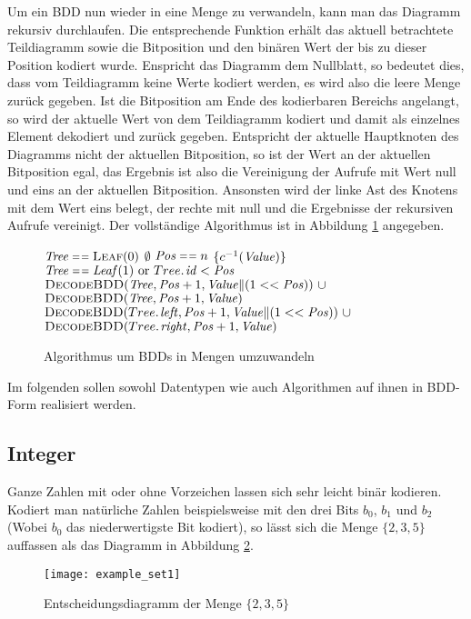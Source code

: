Um ein BDD nun wieder in eine Menge zu verwandeln, kann man das Diagramm rekursiv durchlaufen.
Die entsprechende Funktion erhält das aktuell betrachtete Teildiagramm sowie die Bitposition und den binären Wert der bis zu dieser Position kodiert wurde.
Enspricht das Diagramm dem Nullblatt, so bedeutet dies, dass vom Teildiagramm keine Werte kodiert werden, es wird also die leere Menge zurück gegeben.
Ist die Bitposition am Ende des kodierbaren Bereichs angelangt, so wird der aktuelle Wert von dem Teildiagramm kodiert und damit als einzelnes Element dekodiert und zurück gegeben.
Entspricht der aktuelle Hauptknoten des Diagramms nicht der aktuellen Bitposition, so ist der Wert an der aktuellen Bitposition egal, das Ergebnis ist also die Vereinigung der Aufrufe mit Wert null und eins an der aktuellen Bitposition.
Ansonsten wird der linke Ast des Knotens mit dem Wert eins belegt, der rechte mit null und die Ergebnisse der rekursiven Aufrufe vereinigt.
Der vollständige Algorithmus ist in Abbildung \ref{alg:decode_bdd} angegeben.

\begin{figure}[h]
\begin{codebox}
\li \If $\id{Tree}\isequal\proc{Leaf}(0)$\Then
\li \Return $\emptyset$
\li \ElseIf $\id{Pos}\isequal n$\Then
\li \Return $\{c^{-1}(\id{Value})\}$
\li \ElseIf $\id{Tree}\isequal\id{Leaf}(1)\mbox{ or }\attrib{Tree}{id}<\id{Pos}$\Then
\li \Return $\proc{DecodeBDD}(\id{Tree},\id{Pos}+1,\id{Value}\|(1<<\id{Pos}))\ \cup$
\Startalign{\Return}
\> $\proc{DecodeBDD}(\id{Tree},\id{Pos}+1,\id{Value})$
\Stopalign
\li \Else
\li \Return $\proc{DecodeBDD}(\attrib{Tree}{left},\id{Pos}+1,\id{Value}\|(1<<\id{Pos}))\ \cup$
\Startalign{\Return}
\> $\proc{DecodeBDD}(\attrib{Tree}{right},\id{Pos}+1,\id{Value})$
\Stopalign
\End
\end{codebox}
\caption{Algorithmus um BDDs in Mengen umzuwandeln}
\label{alg:decode_bdd}
\end{figure}

Im folgenden sollen sowohl Datentypen wie auch Algorithmen auf ihnen in BDD-Form realisiert werden.
\subsection{Integer}
Ganze Zahlen mit oder ohne Vorzeichen lassen sich sehr leicht binär kodieren.
Kodiert man natürliche Zahlen beispielsweise mit den drei Bits $b_0$, $b_1$ und $b_2$ (Wobei $b_0$ das niederwertigste Bit kodiert), so lässt sich die Menge $\{2,3,5\}$ auffassen als das Diagramm in Abbildung \ref{fig:example_set1_bdd}.
\begin{figure}[h]
  \centering
  \texttt{[image: example\_set1]}
  \caption{Entscheidungsdiagramm der Menge $\{2,3,5\}$}
  \label{fig:example_set1_bdd}
\end{figure}

